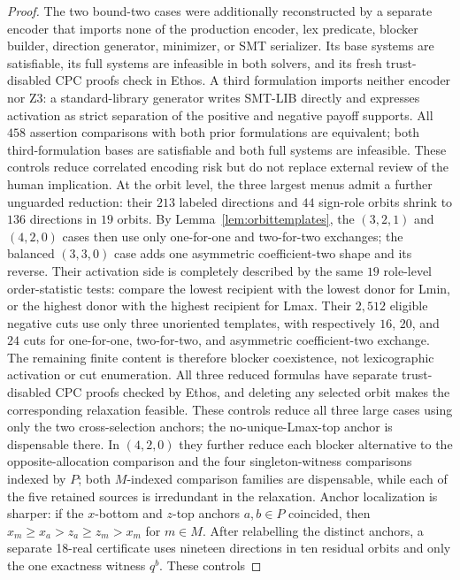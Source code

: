 \documentclass[11pt]{article}
\begin{document}
\begin{proof}
The two bound-two cases were additionally reconstructed by a separate encoder
that imports none of the production encoder, lex predicate, blocker builder,
direction generator, minimizer, or SMT serializer.  Its base systems are
satisfiable, its full systems are infeasible in both solvers, and its fresh
trust-disabled CPC proofs check in Ethos.  A third formulation imports neither
encoder nor Z3: a standard-library generator writes SMT-LIB directly and
expresses activation as strict separation of the positive and negative payoff
supports.  All $458$ assertion comparisons with both prior formulations are
equivalent; both third-formulation bases are satisfiable and both full systems
are infeasible.  These controls reduce correlated encoding risk but do not
replace external review of the human implication.  At the orbit level, the three
largest menus admit a further unguarded reduction: their $213$ labeled
directions and $44$ sign-role orbits shrink to $136$ directions in $19$
orbits.  By Lemma~\ref{lem:orbittemplates}, the $(3,2,1)$ and $(4,2,0)$
cases then use only one-for-one and
two-for-two exchanges; the balanced $(3,3,0)$ case adds one asymmetric
coefficient-two shape and its reverse.  Their activation side is completely
described by the same $19$ role-level order-statistic tests: compare the
lowest recipient with the lowest donor for Lmin, or the highest donor with
the highest recipient for Lmax.  Their $2{,}512$ eligible negative cuts use
only three unoriented templates, with respectively $16$, $20$, and $24$
cuts for one-for-one, two-for-two, and asymmetric coefficient-two exchange.
The remaining finite content is therefore blocker coexistence, not
lexicographic activation or cut enumeration.  All three reduced formulas have
separate trust-disabled CPC proofs checked by Ethos, and deleting any selected
orbit makes the corresponding relaxation feasible.  These controls reduce
all three large cases using only the two cross-selection anchors; the
no-unique-Lmax-top anchor is dispensable there.  In $(4,2,0)$ they further
reduce each blocker alternative to the opposite-allocation comparison and the
four singleton-witness comparisons indexed by $P$; both $M$-indexed comparison
families are dispensable, while each of the five retained sources is
irredundant in the relaxation.  Anchor localization is sharper: if the
$x$-bottom and $z$-top anchors $a,b\in P$ coincided, then
$x_m\ge x_a>z_a\ge z_m>x_m$ for $m\in M$.  After relabelling the distinct
anchors, a separate 18-real certificate uses nineteen directions in ten
residual orbits and only the one exactness witness $q^b$.  These controls

\end{proof}
\end{document}
